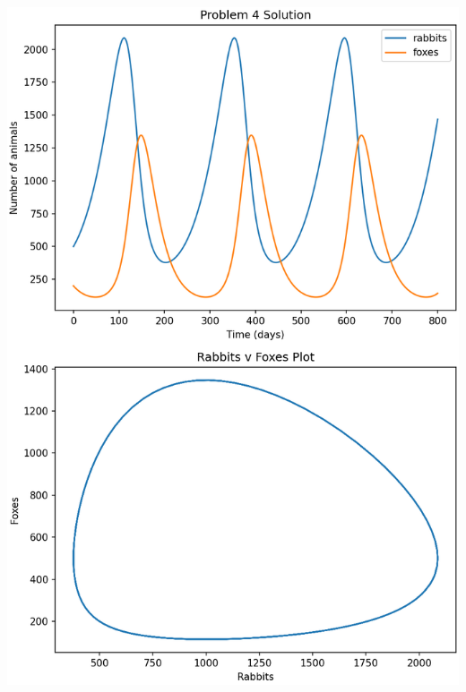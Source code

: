 \documentclass[12pt]{article}
\begin{document}
\begin{enumerate}
    \includegraphics[scale=1]{P_4_figure1.png}

\end{enumerate}
\end{document}
